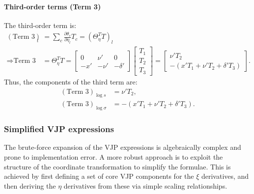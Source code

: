 \documentclass{article}
\begin{document}
\paragraph{Third-order terms (Term 3)}

The third-order term is:
%
\begin{align}
  (\text{Term 3})_l         & = \sum_c \frac{\partial\theta_c}{\partial\eta_l} T_c = (\Theta_\eta^T T)_l \\
  \Rightarrow \text{Term 3} & = \Theta_\eta^T T =
  \begin{bmatrix}
    0   & \nu'  & 0        \\
    -x' & -\nu' & -\delta'
  \end{bmatrix}
  \begin{bmatrix} T_1 \\ T_2 \\ T_3 \end{bmatrix} =
  \begin{bmatrix} \nu' T_2 \\ -(x'T_1 + \nu'T_2 + \delta'T_3) \end{bmatrix}.
\end{align}
%
Thus, the components of the third term are:
%
\begin{align}
  (\text{Term 3})_{\log s}      & = \nu' T_2,                           \\
  (\text{Term 3})_{\log \sigma} & = -(x' T_1 + \nu' T_2 + \delta' T_3).
\end{align}

\subsubsection{Simplified VJP expressions}

The brute-force expansion of the VJP expressions is algebraically complex and prone to implementation error.
A more robust approach is to exploit the structure of the coordinate transformation to simplify the formulae.
This is achieved by first defining a set of core VJP components for the $\xi$ derivatives, and then deriving the $\eta$ derivatives from these via simple scaling relationships.
\end{document}
